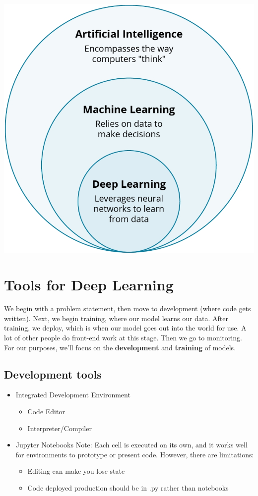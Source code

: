   \includegraphics[width=1\linewidth]{img//intro/aimldl.jpeg}

\section{Tools for Deep Learning}
We begin with a problem statement, then move to development (where code gets written). Next, we begin training, where our model learns our data. After training, we deploy, which is when our model goes out into the world for use. A lot of other people do front-end work at this stage. Then we go to monitoring. For our purposes, we'll focus on the \textbf{development} and \textbf{training} of models.

\subsection{Development tools}

\begin{itemize}
    \item Integrated Development Environment

\begin{itemize}
        \item Code Editor
        \item Interpreter/Compiler
\end{itemize}

    \item Jupyter Notebooks
Note: Each cell is executed on its own, and it works well for environments to prototype or present code. However, there are limitations:

\begin{itemize}
        \item Editing can make you lose state
        \item Code deployed production should be in .py rather than notebooks
\end{itemize}

\end{itemize}

